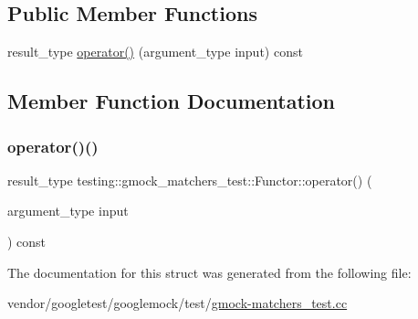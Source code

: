 \subsection*{Public Member Functions}
\begin{DoxyCompactItemize}
\item 
result\+\_\+type \hyperlink{structtesting_1_1gmock__matchers__test_1_1_functor_a5beee965d62e6bc1d591163659bad913}{operator()} (argument\+\_\+type input) const
\end{DoxyCompactItemize}


\subsection{Member Function Documentation}
\mbox{\label{structtesting_1_1gmock__matchers__test_1_1_functor_a5beee965d62e6bc1d591163659bad913}} 
\subsubsection{\texorpdfstring{operator()()}{operator()()}}
{\footnotesize\ttfamily result\+\_\+type testing\+::gmock\+\_\+matchers\+\_\+test\+::\+Functor\+::operator() (\begin{DoxyParamCaption}\item[{argument\+\_\+type}]{input }\end{DoxyParamCaption}) const\hspace{0.3cm}{\ttfamily [inline]}}



The documentation for this struct was generated from the following file\+:\begin{DoxyCompactItemize}
\item 
vendor/googletest/googlemock/test/\hyperlink{gmock-matchers__test_8cc}{gmock-\/matchers\+\_\+test.\+cc}\end{DoxyCompactItemize}
